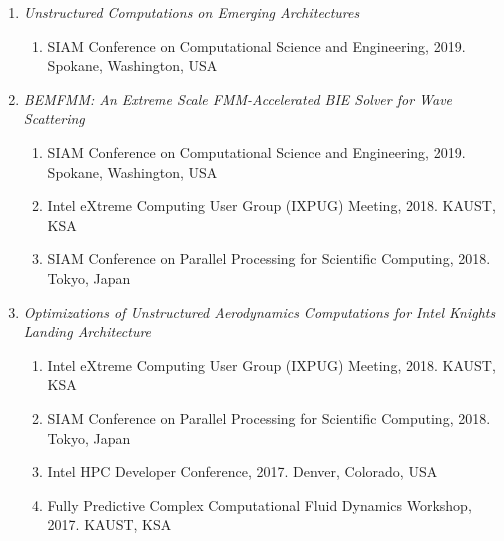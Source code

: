 \documentclass[margin]{resume2}
\begin{document}
\begin{resume}
      \begin{enumerate}[leftmargin=*]
        \item
        {\it Unstructured Computations on Emerging Architectures}
        \begin{enumerate}[leftmargin=*]
          \item
          SIAM Conference on Computational Science and Engineering, 2019. Spokane, Washington, USA
        \end{enumerate}
        \item
        {\it BEMFMM: An Extreme Scale FMM-Accelerated BIE Solver for Wave Scattering}
        \begin{enumerate}[leftmargin=*]
          \item
          SIAM Conference on Computational Science and Engineering, 2019. Spokane, Washington, USA
          \item
          Intel eXtreme Computing User Group (IXPUG) Meeting, 2018. KAUST, KSA
          \item
          SIAM Conference on Parallel Processing for Scientific Computing, 2018. Tokyo, Japan
        \end{enumerate}
        \item
      {\it Optimizations of Unstructured Aerodynamics Computations for Intel Knights Landing Architecture}
        \begin{enumerate}[leftmargin=*]
          \item
          Intel eXtreme Computing User Group (IXPUG) Meeting, 2018. KAUST, KSA
          \item
          SIAM Conference on Parallel Processing for Scientific Computing, 2018. Tokyo, Japan
          \item
          Intel HPC Developer Conference, 2017. Denver, Colorado, USA
          \item
          Fully Predictive Complex Computational Fluid Dynamics Workshop, 2017. KAUST, KSA

\end{enumerate}
\end{enumerate}
\end{resume}
\end{document}
